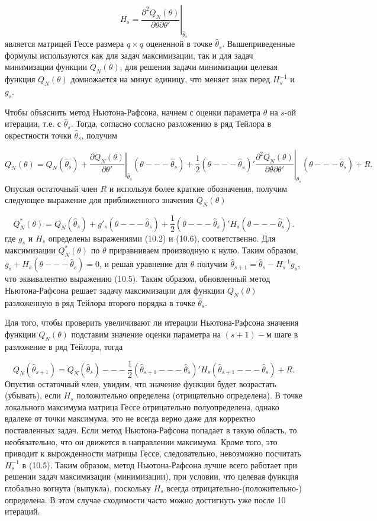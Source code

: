 \begin{equation}
H_s = \left. \dfrac{\partial^2Q_N(\theta)}{\partial\theta\partial\theta'}\right|_{\hat{\theta}_s}
\end{equation}
является матрицей Гессе размера $q{\times}q$ оцененной в точке $\hat{\theta}_s$. Вышеприведенные формулы используются как для задач максимизации, так и для задач минимизации функции $Q_N (\theta)$, для решения задачи минимизации целевая функция $Q_N (\theta)$ домножается на минус единицу, что меняет знак перед $H^{-1}_s$ и $g_s$.

Чтобы объяснить метод Ньютона-Рафсона, начнем  с оценки параметра $\theta$ на $s$-ой итерации, т.е. с $\hat{\theta}_s$. Тогда, согласно согласно разложению в ряд Тейлора в окрестности точки $\hat{\theta}_s$, получим

\[
Q_N(\theta) = \left. Q_N(\hat{\theta}_s)+\dfrac{\partial{Q_N(\theta)}}{\partial{\theta}'}\right|_{\hat{\theta}_s}(\theta --- \hat{\theta}_s)+\left. \dfrac{1}{2}(\theta --- \hat{\theta}_s)'
\dfrac{\partial^2{Q_N(\theta)}}{\partial{\theta}\partial{\theta}'}\right|_{\hat{\theta}_s}(\theta --- \hat{\theta}_s)+R.
\]
Опуская остаточный член $R$ и используя более краткие обозначения, получим следующее выражение для приближенного значения $Q_N(\theta)$

\[
Q^*_N(\theta) = Q_N(\hat{\theta}_s)+g'_s(\theta --- \hat{\theta}_s)+\dfrac{1}{2}(\theta --- \hat{\theta}_s)'H_s(\theta --- \hat{\theta}_s).
\]
где $g_s$ и $H_s$ определены выражениями (10.2) и (10.6), соответственно. Для максимизации $Q^*_N(\theta)$ по $\theta$ приравниваем производную к нулю. Таким образом, $g_s+H_s(\theta --- \hat{\theta}_s) = 0$, и решая уравнение для $\theta$ получим $\hat{\theta}_{s+1} = \hat{\theta}_s-H^{-1}_sg_s$, что эквивалентно выражению (10.5). Таким образом, обновленный метод Ньютона-Рафсона решает задачу максимизации для функции $Q_N(\theta)$ разложенную в ряд Тейлора второго порядка в точке $\hat{\theta}_s$.

Для того, чтобы проверить увеличивают ли итерации Ньютона-Рафсона значения функции $Q_N(\theta)$ подставим значение оценки параметра на $(s+1)-м$ шаге в разложение в ряд Тейлора, тогда

\[
Q_N(\hat{\theta}_{s+1}) = Q_N(\hat{\theta}_s) --- \dfrac{1}{2}(\hat{\theta}_{s+1} --- \hat{\theta}_s)'H_s(\hat{\theta}_{s+1} --- \hat{\theta}_s)+R.
\]
Опустив остаточный член, увидим, что значение функции будет возрастать (убывать), если $H_s$ положительно определена (отрицательно определена). В точке локального максимума матрица Гессе отрицательно полуопределена, однако вдалеке от точки максимума, это не всегда верно даже для корректно поставленных задач. Если метод Ньютона-Рафсона попадает в такую область, то необязательно, что он движется в направлении максимума. Кроме того, это приводит к вырожденности матрицы Гессе, следовательно, невозможно посчитать $H^{-1}_s$ в (10.5). Таким образом, метод Ньютона-Рафсона лучше всего работает при решении задач максимизации (минимизации), при условии, что целевая функция глобально вогнута (выпукла), поскольку $H_s$ всегда отрицательно-(положительно-) определена. В этом случае сходимости часто можно достигнуть уже после 10 итераций.

